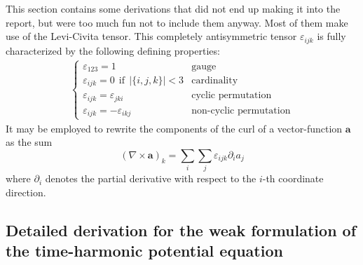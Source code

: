 \documentclass[11pt, a4paper]{article}
\begin{document}
This section contains some derivations that did not end up making it into the
report, but were too much fun not to include them anyway. Most of them make
use of the Levi-Civita tensor. This completely antisymmetric tensor
$\varepsilon_{ijk}$ is fully characterized by the following defining properties:
\begin{align}
    \begin{cases}
        \varepsilon_{123} = 1 & \text{gauge}\\
        \varepsilon_{ijk} = 0~~\text{if}~~|\{i, j, k\}| < 3 & \text{cardinality} \\
        \varepsilon_{ijk} = \varepsilon_{jki} & \text{cyclic permutation}\\
        \varepsilon_{ijk} = - \varepsilon_{ikj} & \text{non-cyclic permutation}
        \label{equ:levi-civita-properties}
    \end{cases}
\end{align}
It may be employed to rewrite the
components of the curl of a vector-function $\mathbf{a}$ as the sum
\begin{equation}
    (\nabla \times \mathbf{a})_k = \sum_i \sum_j \varepsilon_{ijk} \partial_i a_j \label{equ:levi-civita}
\end{equation}
where $\partial_i$ denotes the partial derivative with respect to the $i$-th coordinate
direction.

\subsection*{Detailed derivation for the weak formulation of the time-harmonic potential equation}
\label{subsec:derivation}
\end{document}
